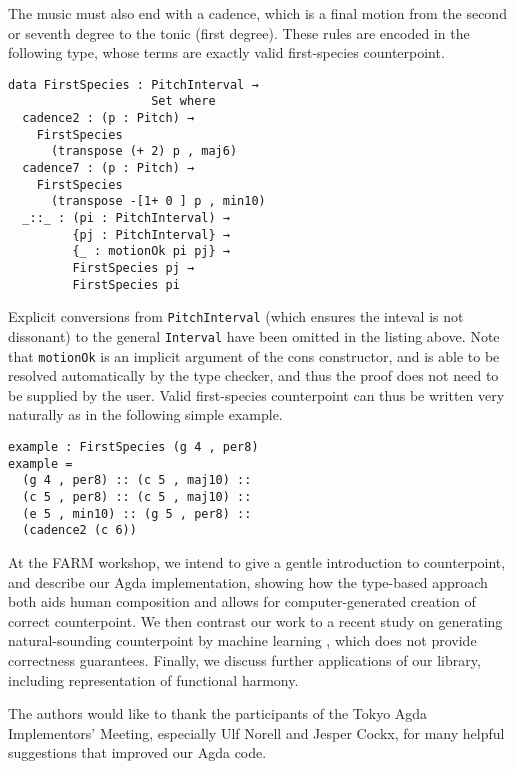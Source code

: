 \documentclass[sigplan,review]{acmart}\settopmatter{printfolios=true,printccs=false,printacmref=false}
\begin{document}
The music must also end with a cadence, which is a final motion from
the second or seventh degree to the tonic (first degree). These rules
are encoded in the following type, whose terms are exactly valid
first-species counterpoint.

\begin{lstlisting}
data FirstSpecies : PitchInterval →
                    Set where
  cadence2 : (p : Pitch) →
    FirstSpecies
      (transpose (+ 2) p , maj6)
  cadence7 : (p : Pitch) →
    FirstSpecies
      (transpose -[1+ 0 ] p , min10)
  _::_ : (pi : PitchInterval) →
         {pj : PitchInterval} →
         {_ : motionOk pi pj} →
         FirstSpecies pj →
         FirstSpecies pi
\end{lstlisting}

Explicit conversions from \texttt{PitchInterval} (which ensures
the inteval is not dissonant) to the general \texttt{Interval} have
been omitted in the listing above.
Note that \texttt{motionOk} is an implicit argument of the cons
constructor, and is able to be resolved automatically by the type checker,
and thus the proof does not need to be supplied by the user. Valid
first-species counterpoint can thus be written very naturally as
in the following simple example.

\begin{lstlisting}
example : FirstSpecies (g 4 , per8)
example = 
  (g 4 , per8) :: (c 5 , maj10) ::
  (c 5 , per8) :: (c 5 , maj10) ::
  (e 5 , min10) :: (g 5 , per8) ::
  (cadence2 (c 6))
\end{lstlisting}

At the FARM workshop, we intend to give a gentle introduction to
counterpoint, and describe our Agda implementation, showing how the
type-based approach both aids human composition and allows for 
computer-generated creation of correct counterpoint.
We then contrast our work to a recent study on generating
natural-sounding counterpoint by machine learning
\citep{CounterpointByConvolution}, which does not provide correctness
guarantees.
Finally, we discuss further applications of our library, including
representation of functional harmony.


\begin{acks}                            %
 The authors would like to thank the participants of the Tokyo Agda 
 Implementors' Meeting, especially Ulf Norell and Jesper Cockx,
 for many helpful suggestions that improved our Agda code.
\end{acks}



\end{document}
